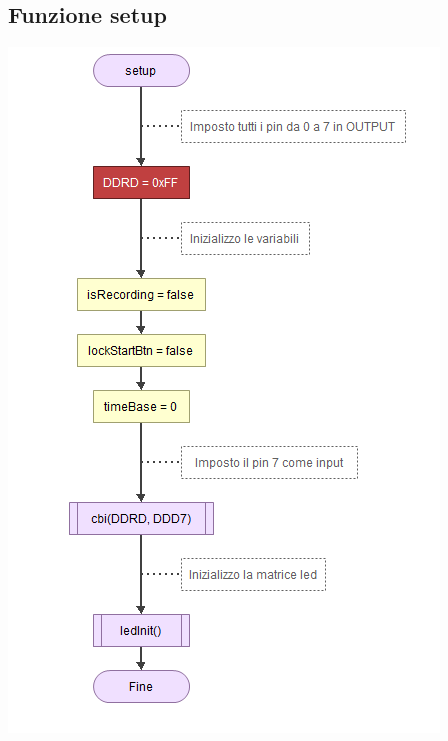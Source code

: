 \documentclass{article}
\begin{document}
\subsection{Funzione setup}
\includegraphics[scale=.60]{funSetup.png}
\end{document}
